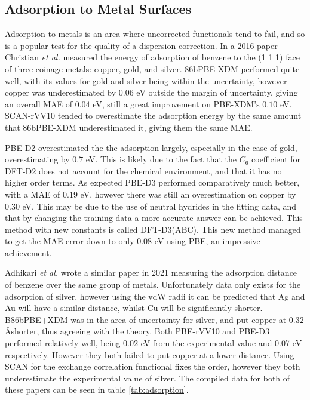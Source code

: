 \documentclass[10pt,a4paper,twocolumn,twoside]{extarticle}
\newcommand{\al}{\emph{et al. }}
\newcommand{\oA}{\si{\angstrom}}
\begin{document}
	\subsection{Adsorption to Metal Surfaces}
	\label{sec:adsorption}
	Adsorption to metals is an area where uncorrected functionals tend to fail, and so is a popular test for the quality of a dispersion correction. In a 2016 paper Christian \al measured\cite{Christian2016-CoinageAdsorption} the energy of adsorption of benzene to the (1 1 1) face of three coinage metals: copper, gold, and silver. 86bPBE-XDM performed quite well, with its values for gold and silver being within the uncertainty, however copper was underestimated by $0.06$ eV outside the margin of uncertainty, giving an overall MAE of  $0.04$ eV, still a great improvement on PBE-XDM's $0.10$ eV. SCAN-rVV10 tended to overestimate the adsorption energy by the same amount that 86bPBE-XDM underestimated it, giving them the same MAE. 

	PBE-D2 overestimated the the adsorption largely, especially in the case of gold, overestimating by $0.7$ eV. This is likely due to the fact that the $C_6$ coefficient for DFT-D2 does not account for the chemical environment, and that it has no higher order terms. As expected PBE-D3 performed comparatively much better, with a MAE of $0.19$ eV, however there was still an overestimation on copper by $0.30$ eV. This may be due to the use of neutral hydrides in the fitting data, and that by changing the training data a more accurate answer can be achieved.\cite{D3-ABC} This method with new constants is called DFT-D3(ABC). This new method managed to get the MAE error down to only $0.08$ eV using PBE, an impressive achievement.

	Adhikari \al wrote a similar paper in 2021\cite{VV10-Adsorption} measuring the adsorption distance of benzene over the same group of metals. Unfortunately data only exists for the adsorption of silver, however using the vdW radii it can be predicted that Ag and Au will have a similar distance, whilst Cu will be significantly shorter. B86bPBE+XDM was in the area of uncertainty for silver, and put copper at 0.32 \oA shorter, thus agreeing with the theory. Both PBE-rVV10 and PBE-D3 performed relatively well, being 0.02 eV from the experimental value and 0.07 eV respectively. However they both failed to put copper at a lower distance. Using SCAN for the exchange correlation functional fixes the order, however they both underestimate the experimental value of silver. The compiled data for both of these papers can be seen in table \ref{tab:adsorption}.
\end{document}
